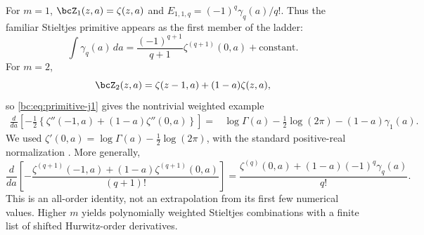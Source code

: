 For $m=1$, $\bcZ_1(z,a)=\zeta(z,a)$ and
$E_{1,1,q}=(-1)^q\gamma_q(a)/q!$. Thus the familiar Stieltjes primitive
appears as the first member of the ladder:
\begin{equation}\label{bc:eq:classical-Stieltjes-primitive}
 \int\gamma_q(a)\,da=
       \frac{(-1)^{q+1}}{q+1}\zeta^{(q+1)}(0,a)+\text{constant}.
\end{equation}
For $m=2$,
\begin{equation}\label{bc:eq:Z2}
 \bcZ_2(z,a)=\zeta(z-1,a)+(1-a)\zeta(z,a),
\end{equation}
so \eqref{bc:eq:primitive-j1} gives the nontrivial weighted example
\begin{align}
 \frac{d}{da}\left[-\frac12\left\{
             \zeta''(-1,a)+(1-a)\zeta''(0,a)\right\}\right]
   ={}&\log\Gamma(a)-\frac12\log(2\pi)
                           -(1-a)\gamma_1(a).
 \label{bc:eq:weighted-Stieltjes-primitive}
\end{align}
We used $\zeta'(0,a)=\log\Gamma(a)-\tfrac12\log(2\pi)$, with the
standard positive-real normalization \cite{dlmf-hurwitz}. More generally,
\begin{equation}\label{bc:eq:weighted-general-q}
 \frac{d}{da}\left[-\frac{
       \zeta^{(q+1)}(-1,a)+(1-a)\zeta^{(q+1)}(0,a)}{(q+1)!}\right]
 =\frac{\zeta^{(q)}(0,a)+(1-a)(-1)^q\gamma_q(a)}{q!}.
\end{equation}
This is an all-order identity, not an extrapolation from its first
few numerical values. Higher $m$ yields polynomially weighted
Stieltjes combinations with a finite list of shifted Hurwitz-order
derivatives.
